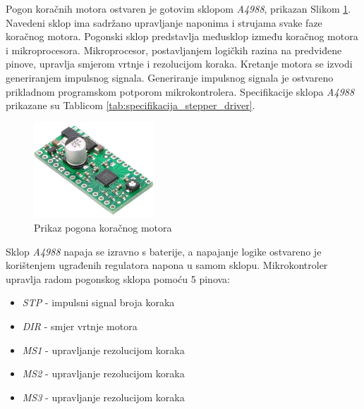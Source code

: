 \documentclass[11pt,a4paper]{article}
\begin{document}
Pogon koračnih motora ostvaren je gotovim sklopom \textit{A4988}, prikazan Slikom \ref{Slika:stepper_driver}. Navedeni sklop ima sadržano upravljanje naponima i strujama svake faze koračnog motora. Pogonski sklop predstavlja međusklop između koračnog motora i mikroprocesora. Mikroprocesor, postavljanjem logičkih razina na predviđene pinove, upravlja smjerom vrtnje i rezolucijom koraka. Kretanje motora se izvodi generiranjem impulsnog signala. Generiranje impulsnog signala je ostvareno prikladnom programskom potporom mikrokontrolera. Specifikacije sklopa \textit{A4988} prikazane su Tablicom \ref{tab:specifikacija_stepper_driver}.


\begin{figure}[H]
	\centering
	\includegraphics[width=0.4\textwidth]{figures/driver.jpg}
	\caption{Prikaz pogona koračnog motora}
	\label{Slika:stepper_driver}
\end{figure}

Sklop \textit{A4988} napaja se izravno s baterije, a napajanje logike ostvareno je korištenjem ugrađenih regulatora napona u samom sklopu. Mikrokontroler upravlja radom pogonskog sklopa pomoću 5 pinova:
\begin{center}
	\begin{itemize}
		\item \textit{STP} - impulsni signal broja koraka
		\item \textit{DIR} - smjer vrtnje motora
		\item \textit{MS1} - upravljanje rezolucijom koraka
		\item \textit{MS2} - upravljanje rezolucijom koraka
		\item \textit{MS3} - upravljanje rezolucijom koraka
	\end{itemize}
\end{center}
\end{document}
